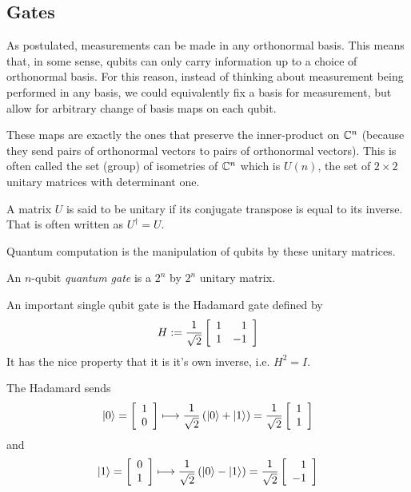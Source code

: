         
    
\subsection{Gates}
        
        As postulated, measurements can be made in any orthonormal basis. This means that, in some sense, qubits 
        can only carry information up to a choice of orthonormal basis. For this reason, instead of thinking about 
        measurement being performed in any basis, we could equivalently fix a basis for measurement, but allow for 
        arbitrary change of basis maps on each qubit. 
        
        These maps are exactly the ones that preserve the inner-product on $\mathbb{C}^n$ (because they send pairs of 
        orthonormal vectors to pairs of orthonormal vectors). This is often called the set (group) of isometries
        of $\mathbb{C}^n$ which is $U(n)$, the set of $2 \times 2$  unitary matrices with determinant one.
                
        \begin{definition}
            A matrix $U$ is said to be unitary if its conjugate transpose is equal to its inverse. That is often 
            written as $U^\dagger = U$.
        \end{definition}
        
        Quantum computation is the manipulation of qubits by these unitary matrices.

        \begin{definition}
            An $n$-qubit \emph{quantum gate} is a $2^n$ by $2^n$ unitary matrix.
        \end{definition}
        

        \begin{example}
            An important single qubit gate is the Hadamard gate defined by 
            \[
                H := \frac{1}{\sqrt{2}} \left[\begin{array}{rr}1&1\\1&-1\end{array}\right]
            \]
            It has the nice property that it is it's own inverse, i.e. $H^2 = I$.

            The Hadamard sends
            \[
                \ket{0} = \left[\begin{array}{r}1\\0\end{array}\right]  \longmapsto \frac{1}{\sqrt{2}}\left(\ket{0} + \ket{1}\right)  = 
                \frac{1}{\sqrt{2}} \left[\begin{array}{r}1\\1\end{array}\right]
            \]
            and
            \[
                \ket{1} = \left[\begin{array}{r}0\\1\end{array}\right] \longmapsto \frac{1}{\sqrt{2}}\left( \ket{0} - \ket{1} \right) = 
                \frac{1}{\sqrt{2}} \left[\begin{array}{r}1\\-1\end{array}\right]
            \]

        \end{example}
        
